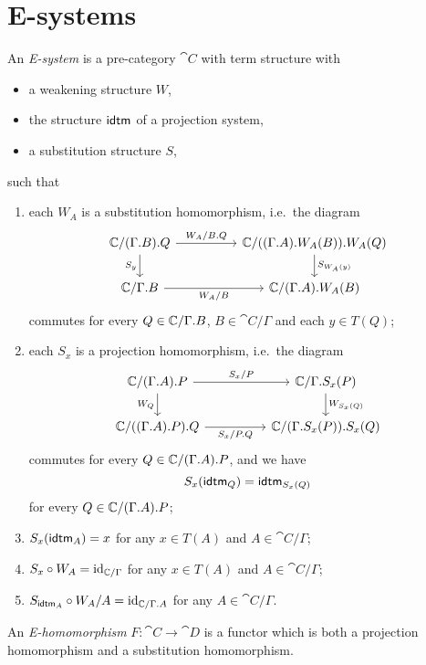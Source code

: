 \section{E-systems}
\begin{defn}
\label{defn:esystems}
An \emph{E-system} is a pre-category $\cat{C}$ with term structure with
\begin{itemize}
\item a weakening structure $W$,
\item the structure $\tfid{}$ of a projection system,
\item a substitution structure $S$,
\end{itemize}
such that
\begin{enumerate}
\item each $W_A$ is a substitution homomorphism, i.e.~the diagram
\begin{equation*}
\begin{tikzcd}[column sep=huge]
\cat{C}/\ctxext{{\Gamma}{B}}{Q}
  \arrow[r,"W_A/\ctxext{B}{Q}"]
  \arrow[d,swap,"S_y"]
  &
\cat{C}/\ctxext{{{\Gamma}{A}}{W_A(B)}}{W_A(Q)}
  \arrow[d,"S_{W_A(y)}"]
  \\
\cat{C}/\ctxext{\Gamma}{B}
  \arrow[r,swap,"W_A/B"]
  &
\cat{C}/\ctxext{{\Gamma}{A}}{W_A(B)}
\end{tikzcd}
\end{equation*}
commutes for every $Q\in\cat{C}/\ctxext{\Gamma}{B}$, $B\in\cat{C}/\Gamma$ and each 
$y\in T(Q)$; 
\item each $S_x$ is a projection homomorphism, i.e.~the diagram
\begin{equation*}
\begin{tikzcd}[column sep=huge]
\cat{C}/\ctxext{{\Gamma}{A}}{P}
  \arrow[r,"S_x/P"]
  \arrow[d,swap,"W_Q"]
  &
\cat{C}/\ctxext{\Gamma}{S_x(P)}
  \arrow[d,"W_{S_x(Q)}"]
  \\
\cat{C}/\ctxext{{{\Gamma}{A}}{P}}{Q}
  \arrow[r,swap,"S_x/\ctxext{P}{Q}"]
  &
\cat{C}/\ctxext{{\Gamma}{S_x(P)}}{S_x(Q)}
\end{tikzcd}
\end{equation*}
commutes for every $Q\in\cat{C}/\ctxext{{\Gamma}{A}}{P}$, and we have
\begin{equation*}
S_x(\tfid{Q})=\tfid{S_x(Q)}
\end{equation*}
for every $Q\in\cat{C}/\ctxext{{\Gamma}{A}}{P}$;
\item $S_x(\tfid{A})=x$ for any $x\in T(A)$ and $A\in\cat{C}/\Gamma$;
\item \label{tTf:StWf_id} $S_x\circ W_A={\mathrm{id}_{\mathbb{C}/\Gamma}}$ for any $x\in T(A)$ and $A\in\cat{C}/\Gamma$;
\item \label{f:SidfWff_id} $S_{\tfid{A}}\circ W_A/A=\catid{\cat{C}/\ctxext{\Gamma}{A}}$ for any $A\in\cat{C}/\Gamma$.
\end{enumerate}
An \emph{E-homomorphism} $F:\cat{C}\to\cat{D}$ is a functor which is both a projection
homomorphism and a substitution homomorphism.
\end{defn}

